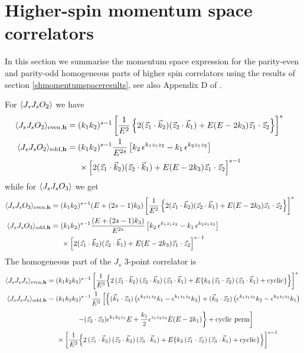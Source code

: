 \documentclass[a4paper,11pt]{article}
\begin{document}
\section{Higher-spin momentum space correlators}\label{higherspin-correlator}
In this section we summarise the momentum space expression for the parity-even and parity-odd homogeneous parts of higher spin correlators using the results of section \ref{shmomentumspaceresults}, see also Appendix D of \cite{Jain:2021qcl}.

For $\ev{J_s J_s O_2}$ we have
\begin{align}\label{spinsintermsofspin1}
\langle J_sJ_sO_2\rangle_{\text{even},\bf{h}}
&=(k_1 k_2)^{s-1}\left[\frac{1}{E^2} \left\{2(\vec{z}_1\cdot \vec{k}_2)( \vec{z}_2\cdot \vec{k}_1) +E (E-2k_3)\vec{z}_1\cdot \vec{z}_2 \right\}\right]^s\cr
\langle J_sJ_sO_2\rangle_{\text{odd},\bf{h}}
&= (k_1 k_2)^{s-1}\frac{1}{E^{2s}}\left[k_2\,\epsilon^{ k_1 z_1 z_2}- k_1\,\epsilon^{k_2 z_1  z_2}\right]\cr
&\hspace{.5cm}\times \left[2(\vec{z}_1\cdot \vec{k}_2)( \vec{z}_2\cdot \vec{k}_1) +E (E-2k_3)\vec{z}_1\cdot \vec{z}_2 \right]^{s-1}
\end{align}
while for $\ev{J_s J_s O_3}$ we get
\begin{align}\label{spinsintermsofspin1b}
\langle J_sJ_sO_3\rangle_{\text{even},\bf{h}}
&=(k_1 k_2)^{s-1}(E+(2s-1)k_3)\left[\frac{1}{E^2} \left\{2(\vec{z}_1\cdot \vec{k}_2)( \vec{z}_2\cdot \vec{k}_1) +E (E-2k_3)\vec{z}_1\cdot \vec{z}_2 \right\}\right]^s\cr
\langle J_sJ_sO_3\rangle_{\text{odd},\bf{h}}
&= (k_1 k_2)^{s-1}\frac{(E+(2s-1)k_3)}{E^{2s}}\left[k_2\,\epsilon^{ k_1 z_1 z_2}- k_1\,\epsilon^{k_2 z_1  z_2}\right]\cr
&\hspace{.5cm}\times \left[2(\vec{z}_1\cdot \vec{k}_2)( \vec{z}_2\cdot \vec{k}_1) +E(E-2k_3)\vec{z}_1\cdot \vec{z}_2 \right]^{s-1}
\end{align}
The homogeneous part of the $J_s$ 3-point correlator is
\begin{align}\label{spinsintermsofspin1c}
\langle J_sJ_sJ_s\rangle_{\text{even},\bf{h}}
&=(k_1 k_2 k_3)^{s-1}\left[\frac{1}{E^3} \Big\{2\,(\vec{z}_1\cdot \vec{k}_2) \, (\vec{z}_2\cdot \vec{k}_3) \, (\vec{z}_3\cdot \vec{k}_1)+E \{k_3\, (\vec{z}_1\cdot \vec{z}_2) \, (\vec{z}_3\cdot \vec{k}_1)+ \text{cyclic}\}\Big\}\right]^s\cr
\langle J_sJ_sJ_s\rangle_{\text{odd},\bf{h}}
&=(k_1 k_2 k_3)^{s-1}\frac{1}{E^3}\left[\left\{(\vec{k}_1 \cdot \vec{z}_3)\left(\epsilon^{k_3 z_1 z_2}k_1-\epsilon^{k_1 z_1 z_2}k_3\right)+(\vec{k}_3 \cdot \vec{z}_2)\left(\epsilon^{k_1 z_1 z_3}k_2-\epsilon^{k_2 z_1 z_3}k_1\right)\right.\right.\nonumber\\[5 pt]
&\hspace{1.5cm}\left.\left.-(\vec{z}_2 \cdot \vec{z}_3)\epsilon^{k_1 k_2 z_1}E+\frac{k_1}{2} \epsilon^{z_1 z_2 z_3}E(E-2k_1)\right\}+\text{cyclic perm}\right]\cr
&\hspace{.5cm}\times\left[\frac{1}{E^3} \Big\{2\,(\vec{z}_1\cdot \vec{k}_2) \, (\vec{z}_2\cdot \vec{k}_3) \, (\vec{z}_3\cdot \vec{k}_1)+E \{k_3\, (\vec{z}_1\cdot \vec{z}_2) \, (\vec{z}_3\cdot \vec{k}_1)+ \text{cyclic}\}\Big\}\right]^{s-1}\nonumber\\[5 pt]
\end{align}
\end{document}
